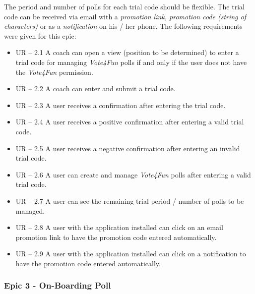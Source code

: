 The period and number of polls for each trial code should be flexible. 
\newline
The trial code can be received via email with a \textit{promotion link, promotion code (string of characters)} or as a \textit{notification} on his /  her phone. 
\newline
The following requirements were given for this epic:

\begin{itemize}
    \item UR – 2.1 
    \newline
    A coach can open a view (position to be determined) to enter a trial code for managing \textit{Vote4Fun} polls if and only if the user does not have the \textit{Vote4Fun} permission.
    \item UR – 2.2
    \newline
    A coach can enter and submit a trial code.
    \item UR – 2.3 
    \newline
    A user receives a confirmation after entering the trial code.
    \item UR – 2.4 
    \newline
    A user receives a positive confirmation after entering a valid trial code.
    \item UR – 2.5 
    \newline
    A user receives a negative confirmation after entering an invalid trial code.
    \item UR – 2.6
    \newline
    A user can create and manage \textit{Vote4Fun} polls after entering a valid trial code.
    \item UR – 2.7 
    \newline
    A user can see the remaining trial period / number of polls to be managed.
    \item UR – 2.8
    \newline
    A user with the application installed can click on an email promotion link to have the promotion code entered automatically.
    \item UR – 2.9 
    \newline
    A user with the application installed can click on a notification to have the promotion code entered automatically.
\end{itemize}

\subsubsection{Epic 3 - On-Boarding Poll}
\label{sssec:epic3}


